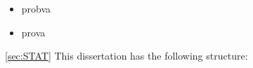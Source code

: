

\label{sec:introduction}

\lipsum
{}
\begin{itemize}
    \item probva
    \item prova
\end{itemize}
\cite{Higgs_discovery_2012_CMS,Higgs_discovery_2012_ATLAS,Higgs_discovery_2013_CMS}
\ref{sec:STAT}
This dissertation has the following structure:
